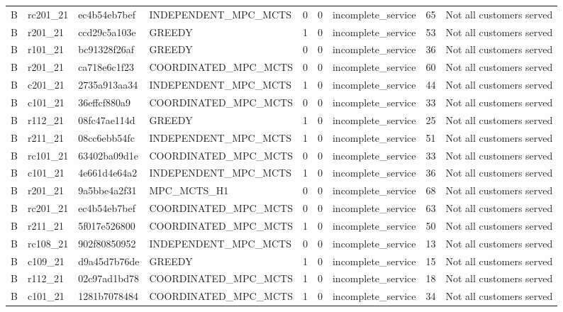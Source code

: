 \begin{table}
{\begin{tabular}{llllrrlrl}
B & rc201\_21 & ec4b54eb7bef & INDEPENDENT\_MPC\_MCTS & 0 & 0 & incomplete\_service & 65 & Not all customers served \\
B & r201\_21 & ccd29c5a103e & GREEDY & 1 & 0 & incomplete\_service & 53 & Not all customers served \\
B & r101\_21 & bc91328f26af & GREEDY & 0 & 0 & incomplete\_service & 36 & Not all customers served \\
B & r201\_21 & ca718e6c1f23 & COORDINATED\_MPC\_MCTS & 0 & 0 & incomplete\_service & 60 & Not all customers served \\
B & c201\_21 & 2735a913aa34 & INDEPENDENT\_MPC\_MCTS & 1 & 0 & incomplete\_service & 44 & Not all customers served \\
B & c101\_21 & 36effcf880a9 & COORDINATED\_MPC\_MCTS & 0 & 0 & incomplete\_service & 33 & Not all customers served \\
B & r112\_21 & 08fc47ae114d & GREEDY & 1 & 0 & incomplete\_service & 25 & Not all customers served \\
B & r211\_21 & 08cc6ebb54fc & INDEPENDENT\_MPC\_MCTS & 1 & 0 & incomplete\_service & 51 & Not all customers served \\
B & rc101\_21 & 63402ba09d1e & COORDINATED\_MPC\_MCTS & 0 & 0 & incomplete\_service & 33 & Not all customers served \\
B & c101\_21 & 4e661d4e64a2 & INDEPENDENT\_MPC\_MCTS & 1 & 0 & incomplete\_service & 36 & Not all customers served \\
B & r201\_21 & 9a5bbe4a2f31 & MPC\_MCTS\_H1 & 0 & 0 & incomplete\_service & 68 & Not all customers served \\
B & rc201\_21 & ec4b54eb7bef & COORDINATED\_MPC\_MCTS & 0 & 0 & incomplete\_service & 63 & Not all customers served \\
B & r211\_21 & 5f017e526800 & COORDINATED\_MPC\_MCTS & 1 & 0 & incomplete\_service & 50 & Not all customers served \\
B & rc108\_21 & 902f80850952 & INDEPENDENT\_MPC\_MCTS & 0 & 0 & incomplete\_service & 13 & Not all customers served \\
B & c109\_21 & d9a45d7b76de & GREEDY & 1 & 0 & incomplete\_service & 15 & Not all customers served \\
B & r112\_21 & 02c97ad1bd78 & COORDINATED\_MPC\_MCTS & 1 & 0 & incomplete\_service & 18 & Not all customers served \\
B & c101\_21 & 1281b7078484 & COORDINATED\_MPC\_MCTS & 1 & 0 & incomplete\_service & 34 & Not all customers served \\

\end{tabular}}
\end{table}
